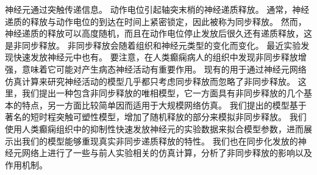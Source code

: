 
 

\makeatletter
\ifthu@bachelor\relax\else
  \ifthu@doctor
  \else
    \ifthu@master
    \fi
  \fi
\fi
\makeatother





\begin{cabstract}
神经元通过突触传递信息。
动作电位引起轴突末梢的神经递质释放。
通常，神经递质的释放与动作电位的到达在时间上紧密锁定，因此被称为同步释放。
然而，神经递质的释放可以高度随机，而且在动作电位停止发放后很久还有递质释放，这是非同步释放。
非同步释放会随着组织和神经元类型的变化而变化。
最近实验发现快速发放神经元中也有。
要注意，在人类癫痫病人的组织中发现非同步释放增强，意味着它可能对产生病态神经活动有重要作用。
现有的用于通过神经元网络仿真计算来研究神经活动的模型几乎都只考虑同步释放而忽略了非同步释放。
这里，我们提出一种包含非同步释放的唯相模型，它一方面具有非同步释放的几个基本的特点，另一方面比较简单因而适用于大规模网络仿真。
我们提出的模型基于著名的短时程突触可塑性模型，增加了随机释放的部分来模拟非同步释放。
我们使用人类癫痫组织中的抑制性快速发放神经元的实验数据来拟合模型参数，进而展示出我们的模型能够重现真实非同步递质释放的特性。
我们也在同步化发放的神经元网络上进行了一些与前人实验相关的仿真计算，分析了非同步释放的影响以及作用机制。
\end{cabstract}

